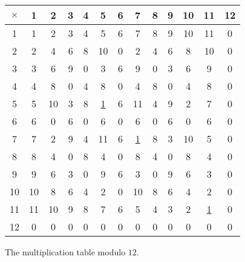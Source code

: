 \documentclass[12pt]{article}
\begin{document}
    \begin{figure}[H]
        \centering
        \begin{tabular}{|c|c|c|c|c|c|c|c|c|c|c|c|c|}
        \hline
        $\times$ & 1 & 2 & 3 & 4 & 5 & 6 & 7 & 8 & 9 & 10 & 11 & 12 \\
        \hline
        1 & 1 & 2 & 3 & 4 & 5 & 6 & 7 & 8 & 9 & 10 & 11 & 0 \\
        2 & 2 & 4 & 6 & 8 & 10 & 0 & 2 & 4 & 6 & 8 & 10 & 0 \\
        3 & 3 & 6 & 9 & 0 & 3 & 6 & 9 & 0 & 3 & 6 & 9 & 0 \\
        4 & 4 & 8 & 0 & 4 & 8 & 0 & 4 & 8 & 0 & 4 & 8 & 0 \\
        5 & 5 & 10 & 3 & 8 & \underline{1} & 6 & 11 & 4 & 9 & 2 & 7 & 0 \\
        6 & 6 & 0 & 6 & 0 & 6 & 0 & 6 & 0 & 6 & 0 & 6 & 0 \\
        7 & 7 & 2 & 9 & 4 & 11 & 6 & \underline{1} & 8 & 3 & 10 & 5 & 0 \\
        8 & 8 & 4 & 0 & 8 & 4 & 0 & 8 & 4 & 0 & 8 & 4 & 0 \\
        9 & 9 & 6 & 3 & 0 & 9 & 6 & 3 & 0 & 9 & 6 & 3 & 0 \\
        10 & 10 & 8 & 6 & 4 & 2 & 0 & 10 & 8 & 6 & 4 & 2 & 0 \\
        11 & 11 & 10 & 9 & 8 & 7 & 6 & 5 & 4 & 3 & 2 & \underline{1} & 0 \\
        12 & 0 & 0 & 0 & 0 & 0 & 0 & 0 & 0 & 0 & 0 & 0 & 0 \\
        \hline
        \end{tabular}
        \caption{The multiplication table modulo $12$.}
        \label{fig:figure1}
    \end{figure}
\end{document}

